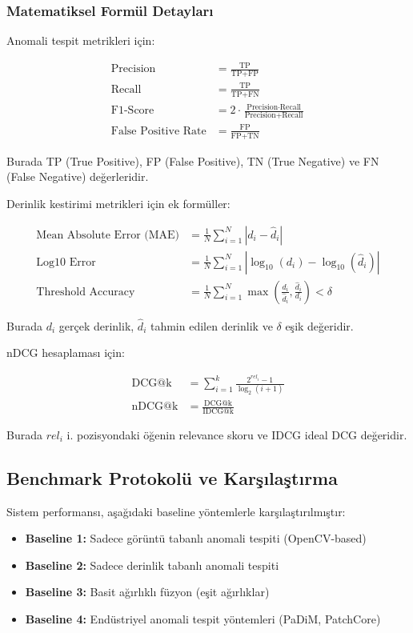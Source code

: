 \documentclass[12pt]{article}
\begin{document}
\subsubsection{Matematiksel Formül Detayları}
Anomali tespit metrikleri için:

\begin{align}
\text{Precision} &= \frac{\text{TP}}{\text{TP} + \text{FP}} \\
\text{Recall} &= \frac{\text{TP}}{\text{TP} + \text{FN}} \\
\text{F1-Score} &= 2 \cdot \frac{\text{Precision} \cdot \text{Recall}}{\text{Precision} + \text{Recall}} \\
\text{False Positive Rate} &= \frac{\text{FP}}{\text{FP} + \text{TN}}
\end{align}

Burada TP (True Positive), FP (False Positive), TN (True Negative) ve FN (False Negative) değerleridir.

Derinlik kestirimi metrikleri için ek formüller:

\begin{align}
\text{Mean Absolute Error (MAE)} &= \frac{1}{N} \sum_{i=1}^{N} |d_i - \hat{d}_i| \\
\text{Log10 Error} &= \frac{1}{N} \sum_{i=1}^{N} |\log_{10}(d_i) - \log_{10}(\hat{d}_i)| \\
\text{Threshold Accuracy} &= \frac{1}{N} \sum_{i=1}^{N} \max\left(\frac{d_i}{\hat{d}_i}, \frac{\hat{d}_i}{d_i}\right) < \delta
\end{align}

Burada $d_i$ gerçek derinlik, $\hat{d}_i$ tahmin edilen derinlik ve $\delta$ eşik değeridir.

nDCG hesaplaması için:

\begin{align}
\text{DCG@k} &= \sum_{i=1}^{k} \frac{2^{rel_i} - 1}{\log_2(i + 1)} \\
\text{nDCG@k} &= \frac{\text{DCG@k}}{\text{IDCG@k}}
\end{align}

Burada $rel_i$ i. pozisyondaki öğenin relevance skoru ve IDCG ideal DCG değeridir.

\subsection{Benchmark Protokolü ve Karşılaştırma}
Sistem performansı, aşağıdaki baseline yöntemlerle karşılaştırılmıştır:

\begin{itemize}
\item \textbf{Baseline 1:} Sadece görüntü tabanlı anomali tespiti (OpenCV-based)
\item \textbf{Baseline 2:} Sadece derinlik tabanlı anomali tespiti
\item \textbf{Baseline 3:} Basit ağırlıklı füzyon (eşit ağırlıklar)
\item \textbf{Baseline 4:} Endüstriyel anomali tespit yöntemleri (PaDiM, PatchCore)
\end{itemize}
\end{document}

